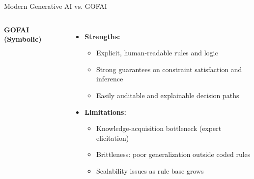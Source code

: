 \documentclass[german,10pt]{beamer}
\begin{document}
\begin{frame}{Modern Generative AI vs. GOFAI}
\begin{columns}[t]
      \textbf{GOFAI (Symbolic)}  
      \begin{itemize}
        \item \textbf{Strengths:}
          \begin{itemize}
            \item Explicit, human‐readable rules and logic  
            \item Strong guarantees on constraint satisfaction and inference  
            \item Easily auditable and explainable decision paths
          \end{itemize}
        \item \textbf{Limitations:}
          \begin{itemize}
            \item Knowledge‐acquisition bottleneck (expert elicitation)  
            \item Brittleness: poor generalization outside coded rules  
            \item Scalability issues as rule base grows
          \end{itemize}
      \end{itemize}
  \end{columns}
\end{frame}
\end{document}

